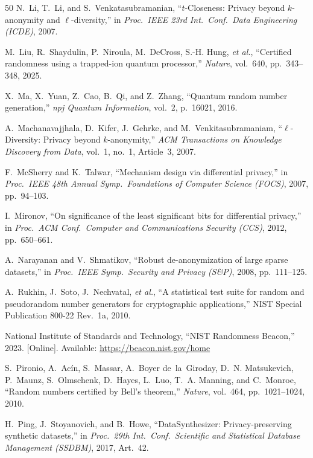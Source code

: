 \documentclass[journal]{IEEEtran}
\begin{document}
\begin{thebibliography}{50}
N.~Li, T.~Li, and S.~Venkatasubramanian, ``$t$-Closeness: Privacy beyond $k$-anonymity and $\ell$-diversity,'' in \emph{Proc.\ IEEE 23rd Int.\ Conf.\ Data Engineering (ICDE)}, 2007.

M.~Liu, R.~Shaydulin, P.~Niroula, M.~DeCross, S.-H. Hung, \emph{et al.}, ``Certified randomness using a trapped-ion quantum processor,'' \emph{Nature}, vol.~640, pp.~343--348, 2025.

X.~Ma, X.~Yuan, Z.~Cao, B.~Qi, and Z.~Zhang, ``Quantum random number generation,'' \emph{npj Quantum Information}, vol.~2, p.~16021, 2016.

A.~Machanavajjhala, D.~Kifer, J.~Gehrke, and M.~Venkitasubramaniam, ``$\ell$-Diversity: Privacy beyond $k$-anonymity,'' \emph{ACM Transactions on Knowledge Discovery from Data}, vol.~1, no.~1, Article~3, 2007.

F.~McSherry and K.~Talwar, ``Mechanism design via differential privacy,'' in \emph{Proc.\ IEEE 48th Annual Symp.\ Foundations of Computer Science (FOCS)}, 2007, pp.~94--103.

I.~Mironov, ``On significance of the least significant bits for differential privacy,'' in \emph{Proc.\ ACM Conf.\ Computer and Communications Security (CCS)}, 2012, pp.~650--661.

A.~Narayanan and V.~Shmatikov, ``Robust de-anonymization of large sparse datasets,'' in \emph{Proc.\ IEEE Symp.\ Security and Privacy (S\&P)}, 2008, pp.~111--125.

A.~Rukhin, J.~Soto, J.~Nechvatal, \emph{et al.}, ``A statistical test suite for random and pseudorandom number generators for cryptographic applications,'' NIST Special Publication 800-22 Rev.~1a, 2010.

{National Institute of Standards and Technology}, ``NIST Randomness Beacon,'' 2023. [Online]. Available: \url{https://beacon.nist.gov/home}

S.~Pironio, A.~Ac\'{i}n, S.~Massar, A.~Boyer de~la~Giroday, D.~N. Matsukevich, P.~Maunz, S.~Olmschenk, D.~Hayes, L.~Luo, T.~A. Manning, and C.~Monroe, ``Random numbers certified by Bell's theorem,'' \emph{Nature}, vol.~464, pp.~1021--1024, 2010.

H.~Ping, J.~Stoyanovich, and B.~Howe, ``{DataSynthesizer}: Privacy-preserving synthetic datasets,'' in \emph{Proc.\ 29th Int.\ Conf.\ Scientific and Statistical Database Management (SSDBM)}, 2017, Art.~42.


\end{thebibliography}
\end{document}
